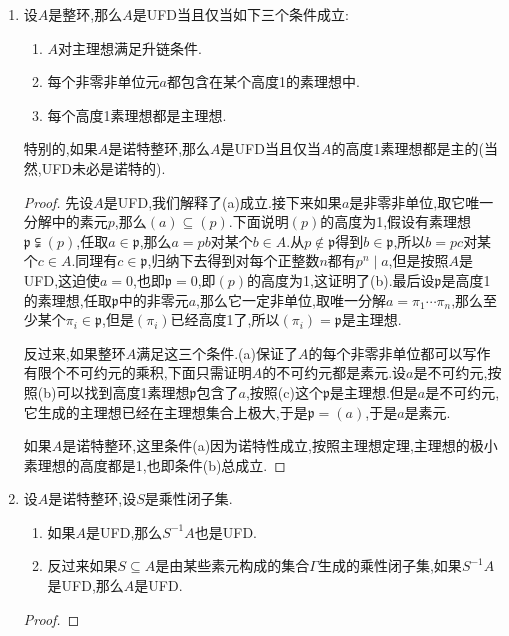 \begin{enumerate}
\begin{proof}
    	我们来证明UFD上不可约元$p$都是素元.取$p$的素元乘积分解$p=p_1\cdots p_n$,按照不可约的定义有$n=1$(否则右侧某个素元是单位),于是$p$是素元.
    \end{proof}
    \item 设$A$是整环,那么$A$是UFD当且仅当如下三个条件成立:
    \begin{enumerate}
    	\item $A$对主理想满足升链条件.
    	\item 每个非零非单位元$a$都包含在某个高度1的素理想中.
    	\item 每个高度1素理想都是主理想.
    \end{enumerate}
    
    特别的,如果$A$是诺特整环,那么$A$是UFD当且仅当$A$的高度1素理想都是主的(当然,UFD未必是诺特的).
    \begin{proof}
    	
    	先设$A$是UFD,我们解释了(a)成立.接下来如果$a$是非零非单位,取它唯一分解中的素元$p$,那么$(a)\subseteq(p)$.下面说明$(p)$的高度为1,假设有素理想$\mathfrak{p}\subsetneqq(p)$,任取$a\in\mathfrak{p}$,那么$a=pb$对某个$b\in A$.从$p\not\in\mathfrak{p}$得到$b\in\mathfrak{p}$,所以$b=pc$对某个$c\in A$.同理有$c\in\mathfrak{p}$,归纳下去得到对每个正整数$n$都有$p^n\mid a$,但是按照$A$是UFD,这迫使$a=0$,也即$\mathfrak{p}=0$,即$(p)$的高度为1,这证明了(b).最后设$\mathfrak{p}$是高度1的素理想,任取$\mathfrak{p}$中的非零元$a$,那么它一定非单位,取唯一分解$a=\pi_1\cdots\pi_n$,那么至少某个$\pi_i\in\mathfrak{p}$,但是$(\pi_i)$已经高度1了,所以$(\pi_i)=\mathfrak{p}$是主理想.
    	
    	\qquad
    	
    	反过来,如果整环$A$满足这三个条件.(a)保证了$A$的每个非零非单位都可以写作有限个不可约元的乘积,下面只需证明$A$的不可约元都是素元.设$a$是不可约元,按照(b)可以找到高度1素理想$\mathfrak{p}$包含了$a$,按照(c)这个$\mathfrak{p}$是主理想.但是$a$是不可约元,它生成的主理想已经在主理想集合上极大,于是$\mathfrak{p}=(a)$,于是$a$是素元.
    	
    	\qquad
    	
    	如果$A$是诺特整环,这里条件(a)因为诺特性成立,按照主理想定理,主理想的极小素理想的高度都是1,也即条件(b)总成立.
    \end{proof}
    \item 设$A$是诺特整环,设$S$是乘性闭子集.
    \begin{enumerate}
    	\item 如果$A$是UFD,那么$S^{-1}A$也是UFD.
    	\item 反过来如果$S\subseteq A$是由某些素元构成的集合$\Gamma$生成的乘性闭子集,如果$S^{-1}A$是UFD,那么$A$是UFD.
    \end{enumerate}
    \begin{proof}
    	

\end{proof}
\end{enumerate}
